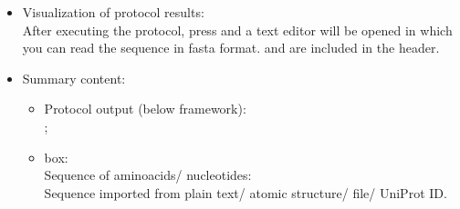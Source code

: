 \begin{itemize}
  \item Visualization of protocol results:\\
  
  After executing the protocol, press  and a text editor will be opened in which you can read the sequence in fasta format.  and  are included in the header. 

 \item Summary content:\\
  \begin{itemize}
     \item Protocol output (below \scipion framework):\\ ; \\
     \item {} box:\\ Sequence of aminoacids/ nucleotides:\\Sequence {} imported from plain text/ atomic structure/ file/ UniProt ID.\\
    \end{itemize}

  \end{itemize}

